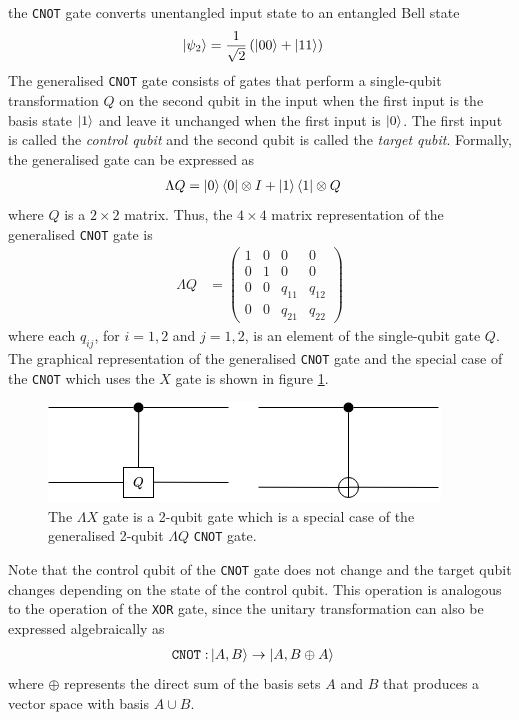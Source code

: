 the \texttt{CNOT} gate converts unentangled input state to an entangled Bell state
\begin{align}
	\ket{\psi_2} 	& = \frac{1}{\sqrt{2}}\left(\ket{00} + \ket{11}\right)\nonumber
\end{align}
The generalised \texttt{CNOT} gate consists of gates that perform a single-qubit transformation $Q$ on the second qubit in the input when the first input is the basis state $\ket{1}$ and leave it unchanged when the first input is $\ket{0}$. The first input is called the \textit{control qubit} and the second qubit is called the \textit{target qubit}. Formally, the generalised  gate can be expressed as
\begin{align}
	\Lambda Q	& = \ket{0}\bra{0}\otimes I + \ket{1}\bra{1}\otimes Q
\end{align}
where $Q$ is a $2\times2$ matrix. Thus, the $4\times4$ matrix representation of the generalised \texttt{CNOT} gate is
\begin{align}\label{eqn:generic-cnot}
	\Lambda Q	& = \left(\begin{matrix}
						1	&0	&0	&0\\
						0	&1	&0	&0\\
						0	&0	&q_{11}	&q_{12}\\
						0	&0	&q_{21}	&q_{22}
					\end{matrix}\right)
\end{align}
where each $q_{ij}$, for $i = 1,2$ and $j=1,2$, is an element of the single-qubit gate $Q$. The graphical representation of the generalised \texttt{CNOT} gate and the special case of the \texttt{CNOT} which uses the $X$ gate is shown in figure \ref{fig:cnotDiagram}.
\begin{figure}
	\centering
	\includegraphics[width=0.75\linewidth]{body/ch2/figs/cnot-diagram}
	\caption[Generalised \texttt{CNOT} gate and the $\Lambda X$ \texttt{CNOT} gate.]{The $\Lambda X$ gate is a 2-qubit gate which is a special case of the generalised 2-qubit $\Lambda Q$ \texttt{CNOT} gate.}
	\label{fig:cnotDiagram}
\end{figure}
Note that the control qubit of the \texttt{CNOT} gate does not change and the target qubit changes depending on the state of the control qubit. This operation is analogous to the operation of the \texttt{XOR} gate, since the unitary transformation can also be expressed algebraically as
\begin{align}
	\texttt{CNOT}: & \ket{A,B} \rightarrow \ket{A, B\oplus A }
\end{align}
where $\oplus$ represents the direct sum of the basis sets $A$ and $B$ that produces a vector space with basis $A\cup B$.

